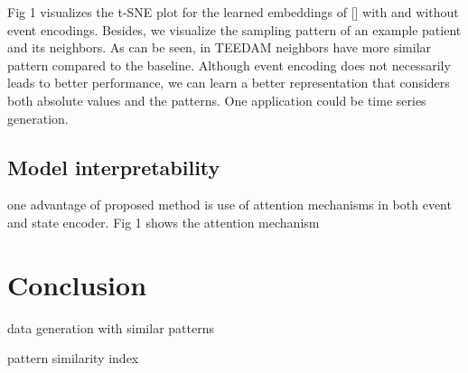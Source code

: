 \documentclass[journal,twoside,web]{ieeecolor}
\begin{document}
Fig 1 visualizes the t-SNE plot for the learned embeddings of [] with and without event encodings. Besides, we visualize the sampling pattern of an example patient and its neighbors. As can be seen,  in TEEDAM neighbors have more similar pattern compared to the baseline. Although event encoding does not necessarily leads to better performance, we can learn a better representation that considers both absolute values and the patterns. One application could be time series generation.


\subsection{Model interpretability}

one advantage of proposed method is use of attention mechanisms in both event and state encoder.
Fig 1 shows the attention mechanism





\section{Conclusion}
\label{sec:Conclusion}

data generation with similar patterns

pattern similarity index












\end{document}
